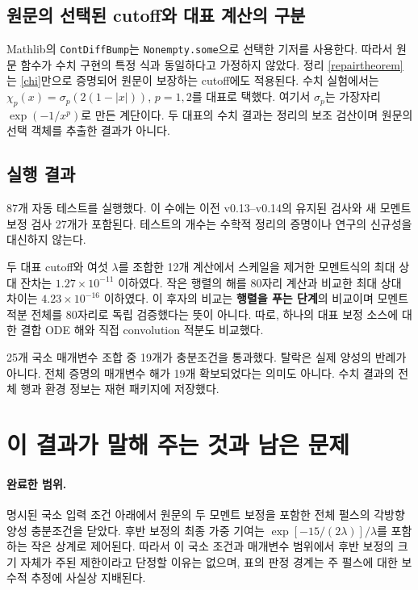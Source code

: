 \documentclass[11pt,a4paper]{article}
\theoremstyle{definition}
\theoremstyle{remark}\newtheorem{remark}[theorem]{주의}
\begin{document}
\subsection{원문의 선택된 cutoff와 대표 계산의 구분}
Mathlib의 \texttt{ContDiffBump}는 \texttt{Nonempty.some}으로 선택한 기저를 사용한다\cite{mathlib}. 따라서 원문 함수가 수치 구현의 특정 식과 동일하다고 가정하지 않았다. 정리 \ref{repairtheorem}는 \eqref{chi}만으로 증명되어 원문이 보장하는 cutoff에도 적용된다. 수치 실험에서는
$\chi_p(x)=\sigma_p(2(1-|x|))$, $p=1,2$를 대표로 택했다. 여기서 $\sigma_p$는 가장자리 $\exp(-1/x^p)$로 만든 계단이다. 두 대표의 수치 결과는 정리의 보조 검산이며 원문의 선택 객체를 추출한 결과가 아니다.

\subsection{실행 결과}
87개 자동 테스트를 실행했다. 이 수에는 이전 v0.13--v0.14의 유지된 검사와 새 모멘트 보정 검사 27개가 포함된다. 테스트의 개수는 수학적 정리의 증명이나 연구의 신규성을 대신하지 않는다.

두 대표 cutoff와 여섯 $\lambda$를 조합한 12개 계산에서 스케일을 제거한 모멘트식의 최대 상대 잔차는 $1.27\times10^{-11}$ 이하였다. 작은 행렬의 해를 80자리 계산과 비교한 최대 상대 차이는 $4.23\times10^{-16}$ 이하였다. 이 후자의 비교는 \textbf{행렬을 푸는 단계}의 비교이며 모멘트 적분 전체를 80자리로 독립 검증했다는 뜻이 아니다. 따로, 하나의 대표 보정 소스에 대한 결합 ODE 해와 직접 convolution 적분도 비교했다.

25개 국소 매개변수 조합 중 19개가 충분조건을 통과했다. 탈락은 실제 양성의 반례가 아니다. 전체 증명의 매개변수 해가 19개 확보되었다는 의미도 아니다. 수치 결과의 전체 행과 환경 정보는 재현 패키지에 저장했다.

\section{이 결과가 말해 주는 것과 남은 문제}
\paragraph{완료한 범위.}
명시된 국소 입력 조건 아래에서 원문의 두 모멘트 보정을 포함한 전체 펄스의 각방향 양성 충분조건을 닫았다. 후반 보정의 최종 가중 기여는 $\exp[-15/(2\lambda)]/\lambda$를 포함하는 작은 상계로 제어된다. 따라서 이 국소 조건과 매개변수 범위에서 후반 보정의 크기 자체가 주된 제한이라고 단정할 이유는 없으며, 표의 판정 경계는 주 펄스에 대한 보수적 추정에 사실상 지배된다.
\end{document}
